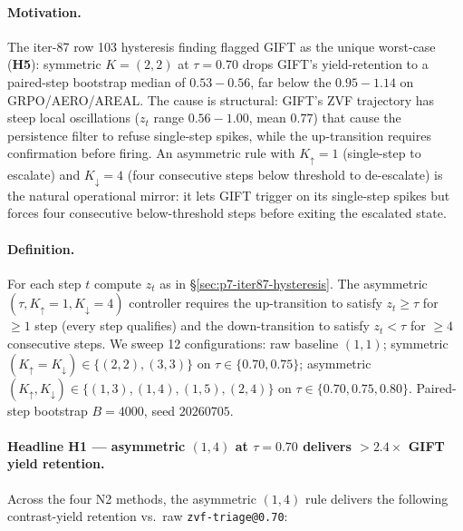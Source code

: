 \documentclass{article}
\begin{document}
\paragraph{Motivation.}
The iter-87 row 103 hysteresis finding flagged GIFT as the unique
worst-case (\textbf{H5}): symmetric $K{=}(2,2)$ at $\tau{=}0.70$ drops
GIFT's yield-retention to a paired-step bootstrap median of
$0.53{-}0.56$, far below the $0.95{-}1.14$ on GRPO/AERO/AREAL.
The cause is structural: GIFT's ZVF trajectory has steep local
oscillations ($z_t$ range $0.56{-}1.00$, mean $0.77$) that cause
the persistence filter to refuse single-step spikes, while the
up-transition requires confirmation before firing.  An asymmetric
rule with $K_{\uparrow}{=}1$ (single-step to escalate) and
$K_{\downarrow}{=}4$ (four consecutive steps below threshold to
de-escalate) is the natural operational mirror: it lets GIFT
trigger on its single-step spikes but forces four consecutive
below-threshold steps before exiting the escalated state.

\paragraph{Definition.}
For each step $t$ compute $z_t$ as in
\S\ref{sec:p7-iter87-hysteresis}.  The asymmetric
$(\tau, K_{\uparrow}{=}1, K_{\downarrow}{=}4)$ controller requires
the up-transition to satisfy $z_t \ge \tau$ for $\ge 1$ step
(every step qualifies) and the down-transition to satisfy
$z_t < \tau$ for $\ge 4$ consecutive steps.  We sweep 12
configurations: raw baseline $(1,1)$; symmetric
$(K_{\uparrow}{=}K_{\downarrow}) \in \{(2,2),(3,3)\}$ on
$\tau \in \{0.70, 0.75\}$; asymmetric $(K_{\uparrow},K_{\downarrow})
\in \{(1,3),(1,4),(1,5),(2,4)\}$ on
$\tau \in \{0.70, 0.75, 0.80\}$.  Paired-step bootstrap $B{=}4000$,
seed $20260705$.

\paragraph{Headline H1 --- asymmetric $(1,4)$ at $\tau{=}0.70$ delivers
$> 2.4\times$ GIFT yield retention.}
Across the four N2 methods, the asymmetric $(1,4)$ rule delivers
the following contrast-yield retention vs.\ raw
\texttt{zvf-triage@0.70}:
\end{document}
